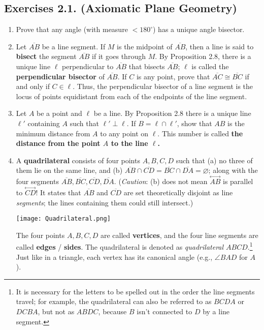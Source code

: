 \documentclass[leqno]{book}
\begin{document}
\subsection*{Exercises 2.1. (Axiomatic Plane Geometry)}
\begin{enumerate}
\item Prove that any angle (with measure $<180^\circ$) has a unique angle bisector.

\item Let $\overline{AB}$ be a line segment.  If $M$ is the midpoint of $\overline{AB}$, then a line is said to \textbf{bisect} the segment $\overline{AB}$ if it goes through $M$.  By Proposition 2.8, there is a unique line $\ell$ perpendicular to $\overline{AB}$ that bisects $\overline{AB}$; $\ell$ is called the \textbf{perpendicular bisector} of $\overline{AB}$.  If $C$ is any point, prove that $\overline{AC}\cong\overline{BC}$ if and only if $C\in\ell$.  Thus, the perpendicular bisector of a line segment is the locus of points equidistant from each of the endpoints of the line segment.

\item Let $A$ be a point and $\ell$ be a line.  By Proposition 2.8 there is a unique line $\ell'$ containing $A$ such that $\ell'\perp\ell$.  If $B=\ell\cap\ell'$, show that $AB$ is the minimum distance from $A$ to any point on $\ell$.  This number is called \textbf{the distance from the point $A$ to the line $\ell$.}

\item A \textbf{quadrilateral} consists of four points $A,B,C,D$ such that (a) no three of them lie on the same line, and (b) $\overline{AB}\cap\overline{CD}=\overline{BC}\cap\overline{DA}=\varnothing$; along with the four segments $\overline{AB},\overline{BC},\overline{CD},\overline{DA}$.  (\emph{Caution}: (b) does not mean $\overset{\longleftrightarrow}{AB}$ is parallel to $\overset{\longleftrightarrow}{CD}$!  It states that $\overline{AB}$ and $\overline{CD}$ are set theoretically disjoint as line \emph{segments}; the lines containing them could still intersect.)
\begin{center}\texttt{[image: Quadrilateral.png]}\end{center}
The four points $A,B,C,D$ are called \textbf{vertices}, and the four line segments are called \textbf{edges} / \textbf{sides}.  The quadrilateral is denoted as \emph{quadrilateral $ABCD$}.\footnote{It is necessary for the letters to be spelled out in the order the line segments travel; for example, the quadrilateral can also be referred to as $BCDA$ or $DCBA$, but not as $ABDC$, because $B$ isn't connected to $D$ by a line segment.}  Just like in a triangle, each vertex has its canonical angle (e.g., $\angle BAD$ for $A$).


\end{enumerate}
\end{document}
